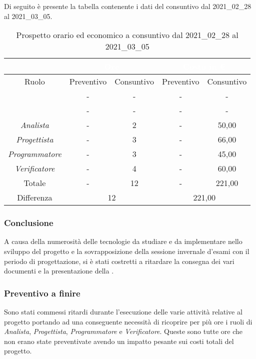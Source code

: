 Di seguito è presente la tabella contenente i dati del consuntivo dal 2021\_02\_28 al 2021\_03\_05.
\begin{table}[H]
	\centering
	\begin{tabular}{|c|c|c|c|c|}
		\rowcolor{darkblue} 
		&\multicolumn{2}{c|}{\textcolor{white}{Ore}}&\multicolumn{2}{c|}{\textcolor{white}{Costo in €}}\\ \hline
		Ruolo			&	Preventivo				&	Consuntivo		&	Preventivo	&	Consuntivo\\ \hline
		{\Responsabile}		&	-					&	-				&	-			&	- \\ \hline
		{\Amministratore}	&	-					&	-				&	-			&	- \\ \hline
		\textit{Analista}	&	-					&	2				&	-			&	50,00 \\ \hline
		\textit{Progettista}& 	-					&   3 				& 	-			&  	66,00 \\ \hline
		\textit{Programmatore}& -					& 	3				& 	-			&  	45,00 \\ \hline
		\textit{Verificatore}&	-					&	4				&	-			&	60,00 \\ \hline
		Totale				&	-					&	12				&	-			&	221,00 \\ \hline
		Differenza			& 	\multicolumn{2}{c|}{12} 					&\multicolumn{2}{c|}{221,00}\\ \hline
	\end{tabular}
	\caption{Prospetto orario ed economico a consuntivo dal 2021\_02\_28 al 2021\_03\_05}
\end{table}
\subsubsection{Conclusione}
A causa della numerosità delle tecnologie da studiare e da implementare nello sviluppo del progetto e la sovrapposizione della sessione invernale d'esami con il periodo di progettazione, si è stati costretti a ritardare la consegna dei vari documenti e la presentazione della .
\subsubsection{Preventivo a finire}
Sono stati commessi ritardi durante l'esecuzione delle varie attività relative al progetto portando ad una conseguente necessità di ricoprire per più ore i ruoli di \textit{Analista}, \textit{Progettista}, \textit{Programmatore} e \textit{Verificatore}. Queste sono tutte ore che non erano state preventivate avendo un impatto pesante sui costi totali del progetto.
